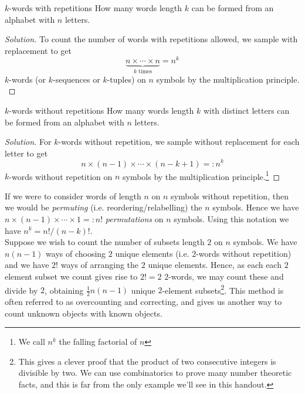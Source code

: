 \documentclass{article}
\begin{document}
\begin{problem}[]{$k$-words with repetitions}
    How many words length $k$ can be formed from an alphabet with $n$ letters.
\end{problem}

\begin{proof}[Solution]
    To count the number of words with repetitions allowed, we sample with replacement to get
    \[\underbrace{n \times \cdots \times n}_{k \text{ times}} = n^k\]
    $k$-words (or $k$-sequences or $k$-tuples) on $n$ symbols by the multiplication principle. \\
\end{proof}

\begin{problem}[]{$k$-words without repetitions}
    How many words length $k$ with distinct letters can be formed from an alphabet with $n$ letters. 
\end{problem}

\begin{proof}[Solution]
    For $k$-words without repetition, we sample without replacement for each letter to get
    \[n \times (n-1) \times \cdots \times (n-k+1) =: n^{\underline{k}}\]
    $k$-words without repetition on $n$ symbols by the multiplication principle.\footnote{
        We call $n^{\underline{k}}$ the falling factorial of $n$}
\end{proof}

If we were to consider words of length $n$ on $n$ symbols without repetition, then we would be {\it permuting} (i.e. reordering/relabelling) 
the $n$ symbols. Hence we have $n \times (n-1) \times \cdots \times 1 =: n!$ {\it permutations} on $n$ symbols. 
Using this notation we have $n^{\underline{k}} = n!/(n-k)!$. \\ 

Suppose we wish to count the number of subsets length $2$ on $n$ symbols. We have $n(n-1)$ ways of choosing 
$2$ unique elements (i.e. $2$-words without repetition) and we have $2!$ ways of arranging the $2$ unique elements. 
Hence, as each each $2$ element subset we count gives rise to $2!=2$ $2$-words, we may count these 
and divide by $2$, obtaining $\frac{1}{2}n(n-1)$ unique $2$-element subsets\footnote{This gives a clever proof that 
the product of two consecutive integers is divisible by two. We can use combinatorics to prove many number theoretic 
facts, and this is far from the only example we'll see in this handout.}. This method is often referred to as overcounting and correcting, and 
gives us another way to count unknown objects with known objects.  
\end{document}
